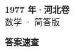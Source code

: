 \documentclass[zihao=-4, a4paper]{ctexart}
\begin{document}
\begin{center}
  {\Large\bfseries 1977 年·河北卷}\\[4pt]
  {\large 数学 · 简答版}
\end{center}
\medskip
{}

\clearpage
{}
\begin{center}{\Large\bfseries 答案速查}\end{center}
\medskip

\end{document}
